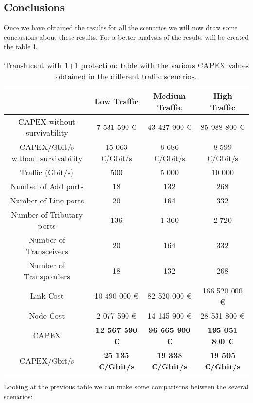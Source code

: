 \clearpage
\subsection{Conclusions}

Once we have obtained the results for all the scenarios we will now draw some conclusions about these results. For a better analysis of the results will be created the table \ref{table_comparative_transluc_protec}.

\begin{table}[h!]
\centering
\begin{tabular}{| c | c | c | c |}
 \hline
  & Low Traffic & Medium Traffic  & High Traffic \\
 \hline\hline
 CAPEX without survivability&7 531 590 \euro&43 427 900 \euro&85 988 800 \euro\\ \hline
 CAPEX/Gbit/s without survivability&15 063 \euro/Gbit/s& 8 686 \euro/Gbit/s&8 599 \euro/Gbit/s\\ \hline
 Traffic (Gbit/s) & 500 & 5 000 & 10 000 \\ \hline
 Number of Add ports & 18 & 132 & 268 \\ \hline
 Number of Line ports & 20 & 164 & 332 \\ \hline
 Number of Tributary ports & 136 & 1 360 & 2 720 \\ \hline
 Number of Transceivers & 20 & 164 & 332 \\ \hline
 Number of Transponders & 18 & 132 & 268 \\ \hline
 Link Cost & 10 490 000 \euro & 82 520 000 \euro & 166 520 000 \euro \\ \hline
 Node Cost & 2 077 590 \euro & 14 145 900 \euro & 28 531 800 \euro \\ \hline
 CAPEX & \textbf{12 567 590 \euro} & \textbf{96 665 900 \euro} & \textbf{195 051 800 \euro} \\ \hline
 CAPEX/Gbit/s & \textbf{25 135 \euro/Gbit/s} & \textbf{19 333 \euro/Gbit/s} & \textbf{19 505 \euro/Gbit/s}\\
 \hline
\end{tabular}
\caption{Translucent with 1+1 protection: table with the various CAPEX values obtained in the different traffic scenarios.}
\label{table_comparative_transluc_protec}
\end{table}

Looking at the previous table we can make some comparisons between the several scenarios:

